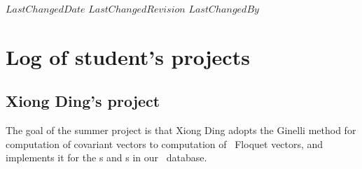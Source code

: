 \ifsvnmulti
 {$LastChangedDate$}
 {$LastChangedRevision$} {$LastChangedBy$}
\fi

\chapter{Log of student's projects}
\label{c-students}

\section{Xiong Ding's project}
\label{sect:introXD}

The goal of the summer project is that Xiong Ding adopts the Ginelli
\etal{} method for computation of covariant vectors to
computation of \po\ Floquet vectors,  and implements it for the \po s and
\rpo s in our \KS\ database.


